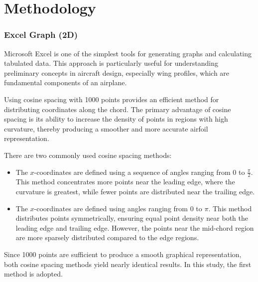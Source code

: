 \section*{Methodology}


\subsubsection*{Excel Graph (2D)}

Microsoft Excel is one of the simplest tools for generating graphs and calculating tabulated data. 
This approach is particularly useful for understanding preliminary concepts in aircraft design, especially wing profiles, 
which are fundamental components of an airplane. 

Using cosine spacing with 1000 points provides an efficient method for distributing coordinates along the chord. 
The primary advantage of cosine spacing is its ability to increase the density of points in regions with high curvature, 
thereby producing a smoother and more accurate airfoil representation.

There are two commonly used cosine spacing methods:

\begin{itemize}
    \item[(1)] The $x$-coordinates are defined using a sequence of angles ranging from $0$ to $\displaystyle \frac{\pi}{2}$. 
    This method concentrates more points near the leading edge, where the curvature is greatest, 
    while fewer points are distributed near the trailing edge.
    
    \item[(2)] The $x$-coordinates are defined using angles ranging from $0$ to $\pi$. This method distributes points symmetrically, 
    ensuring equal point density near both the leading edge and trailing edge. 
    However, the points near the mid-chord region are more sparsely distributed compared to the edge regions.
\end{itemize}

Since 1000 points are sufficient to produce a smooth graphical representation, 
both cosine spacing methods yield nearly identical results. 
In this study, the first method is adopted.


